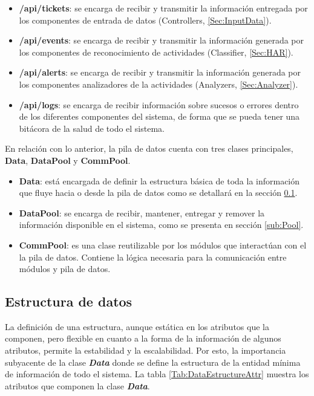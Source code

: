     \begin{itemize}
        \item \textbf{/api/tickets}: se encarga de recibir y transmitir la información entregada por los componentes de entrada de datos (Controllers, \ref{Sec:InputData}).
        \item \textbf{/api/events}: se encarga de recibir y transmitir la información generada por los componentes de reconocimiento de actividades (Classifier, \ref{Sec:HAR}).
        \item \textbf{/api/alerts}: se encarga de recibir y transmitir la información generada por los componentes analizadores de la actividades (Analyzers, \ref{Sec:Analyzer}).
        \item \textbf{/api/logs}: se encarga de recibir información sobre sucesos o errores dentro de los diferentes componentes del sistema, de forma que se pueda tener una bitácora de la salud de todo el sistema.
    \end{itemize}
    
    En relación con lo anterior, la pila de datos cuenta con tres clases principales, 
    \textbf{Data},
    \textbf{DataPool} y 
    \textbf{CommPool}. 
    
    \begin{itemize}
        \item \textbf{Data}: está encargada de definir la estructura básica de toda la información que fluye hacia o desde la pila de datos como se detallará en la sección \ref{sub:DataEstructure}.
        \item \textbf{DataPool}: se encarga de recibir, mantener, entregar y remover la información disponible en el sistema, como se presenta en sección \ref{sub:Pool}.
        \item \textbf{CommPool}: es una clase reutilizable por los módulos que interactúan con el la pila de datos. Contiene la lógica necesaria para la comunicación entre módulos y pila de datos.
    \end{itemize}
    
    \subsection{Estructura de datos}
    \label{sub:DataEstructure}
    
        La definición de una estructura, aunque estática en los atributos que la componen, pero flexible en cuanto a la forma de la información de algunos atributos, permite la estabilidad y la escalabilidad. Por esto, la importancia subyacente de la clase \textbf{\textit{Data}} donde se define la estructura de la entidad mínima de información de todo el sistema. La tabla \ref{Tab:DataEstructureAttr} muestra los atributos que componen la clase \textbf{\textit{Data}}.
        
